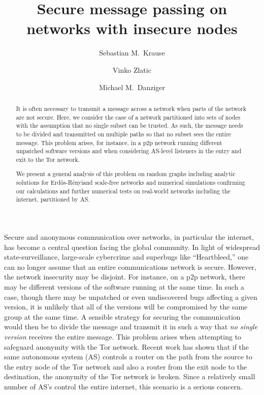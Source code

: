 \documentclass[aps, prl, twocolumn, a4paper, floatfix]{revtex4}
\newcommand{\er}{Erd\H{o}s-R\'{e}nyi}
\begin{document}
\title{Secure message passing on networks with insecure nodes}
\author{Sebastian M.\ Krause}
\author{Vinko Zlatic}
\author{Michael M.\ Danziger}


\begin{abstract}
It is often necessary to transmit a message across a network when parts of the network are not secure.
Here, we consider the case of a network partitioned into sets of nodes with the assumption that no single subset can be trusted.
As such, the message needs to be divided and transmitted on multiple paths so that no subset sees the entire message.
This problem arises, for instance, in a p2p network running different unpatched software versions 
and when considering AS-level listeners in the entry and exit to the Tor network.

We present a general analysis of this problem on random graphs including analytic solutions for \er and scale-free networks and numerical simulations confirming our calculations and further numerical tests on real-world networks including the internet, partitioned by AS.
\end{abstract}
\maketitle

Secure and anonymous communication over networks, in particular the internet, has become a central question facing the global community.
In light of widespread state-surveillance, large-scale cybercrime and superbugs like ``Heartbleed,'' one can no longer assume that an entire communications network is secure.
However, the network insecurity may be disjoint.  
For instance, on a p2p network, there may be different versions of the software running at the same time.  
In such a case, though there may be unpatched or even undiscovered bugs affecting a given version, it is unlikely that all of the versions will be compromised by the same group at the same time.
A sensible strategy for securing the communication would then be to divide the message and transmit it in such a way that \textit{no single version} receives the entire message.
This problem arises when attempting to safeguard anonymity with the Tor network.  
Recent work has shown that if the same autonomous system (AS) controls a router on the path from the source to the entry node of the Tor network and also a router from the exit node to the destination, the anonymity of the Tor network is broken.
Since a relatively small number of AS's control the entire internet, this scenario is a serious concern.
\end{document}
